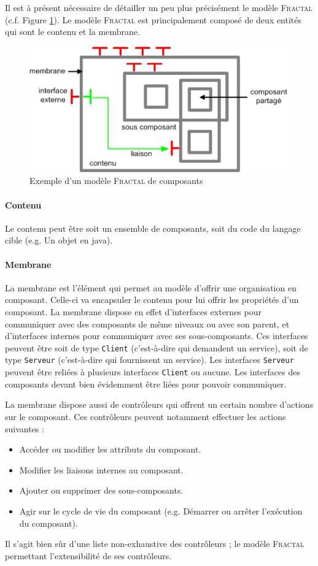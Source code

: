 \documentclass[12pt,a4paper,utf8x]{report}
\newcommand\fractal{\textsc{Fractal}}
\begin{document}
Il est à présent nécessaire de détailler un peu plus précisément le modèle \fractal{} (c.f. Figure \ref{fig:Comp}). Le modèle \fractal{} est principalement composé de deux entités qui sont le contenu et la membrane. 
\begin{figure}[htbp] %
  \center
  \includegraphics{img/fractal_component}
  \caption{Exemple d'un modèle \fractal{} de composants} %
 \label{fig:Comp} %
\end{figure}

\paragraph{Contenu}Le contenu peut être soit un ensemble de composants, soit du code du langage cible (e.g. Un objet en java).
\paragraph{Membrane} La membrane est l'élément qui permet au modèle d'offrir une organisation en composant. Celle-ci va encapsuler le contenu pour lui offrir les propriétés d'un composant. La membrane dispose en effet d'interfaces externes pour communiquer avec des composants de même niveaux ou avec son parent, et d'interfaces internes pour communiquer avec ses sous-composants. Ces interfaces peuvent être soit de type \verb+Client+ (c'est-à-dire qui demandent un service), soit de type \verb+Serveur+ (c'est-à-dire qui fournissent un service). Les interfaces \verb+Serveur+ peuvent être reliées à plusieurs interfaces \verb+Client+ ou aucune. Les interfaces des composants devant bien évidemment être liées pour pouvoir communiquer. 

La membrane dispose aussi de contrôleurs qui offrent un certain nombre d'actions sur le composant. Ces contrôleurs peuvent notamment effectuer les actions suivantes :
\begin{itemize}
 \item Accéder ou modifier les attributs du composant.
 \item Modifier les liaisons internes au composant.
 \item Ajouter ou supprimer des sous-composants.
 \item Agir sur le cycle de vie du composant (e.g. Démarrer ou arrêter l'exécution du composant).
\end{itemize}
Il s'agit bien sûr d'une liste non-exhaustive des contrôleurs ; le modèle \fractal{} permettant l'extensibilité de ses contrôleurs. 
\end{document}
